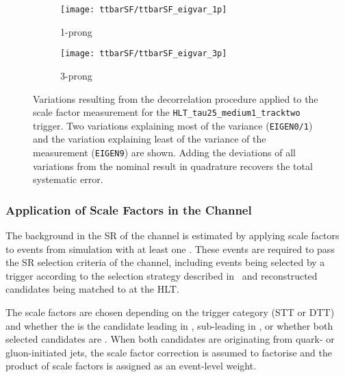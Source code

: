 \begin{figure}[htbp]
  \centering

  \begin{subfigure}[t]{.495\textwidth}
    \texttt{[image: ttbarSF/ttbarSF\_eigvar\_1p]}
    \caption{1-prong \tauhadvis}
    \label{fig:ttbarSF_eigenvariations_1p}
  \end{subfigure}\hfill%
  \begin{subfigure}[t]{.495\textwidth}
    \texttt{[image: ttbarSF/ttbarSF\_eigvar\_3p]}
    \caption{3-prong \tauhadvis}
    \label{fig:ttbarSF_eigenvariations_3p}
  \end{subfigure}

  \caption{Variations resulting from the decorrelation procedure
    applied to the \faketauhadvis scale factor measurement for the
    \texttt{HLT\_tau25\_medium1\_tracktwo} trigger. Two variations
    explaining most of the variance (\texttt{EIGEN0/1}) and the
    variation explaining least of the variance of the measurement
    (\texttt{EIGEN9}) are shown. Adding the deviations of all
    variations from the nominal result in quadrature recovers the
    total systematic error.}%
  \label{fig:ttbarSF_eigenvariations}
\end{figure}


\subsubsection{Application of \faketauhadvis Scale Factors in the
  \hadhad Channel}

The \ttbarFakes background in the SR of the \hadhad channel is estimated by
applying \faketauhadvis scale factors to \ttbar events from simulation with at
least one \faketauhadvis. These events are required to pass the SR selection
criteria of the \hadhad channel, including events being selected by a trigger
according to the selection strategy described in~ and
reconstructed \tauhadvis candidates being matched to \tauhadvis at the HLT.

The scale factors are chosen depending on the trigger category (STT or
DTT) and whether the \faketauhadvis is the \tauhadvis candidate
leading in \pT, sub-leading in \pT, or whether both selected
candidates are \faketauhadvis. When both \tauhadvis candidates are
originating from quark- or gluon-initiated jets, the scale factor correction is
assumed to factorise and the product of scale factors is assigned as
an event-level weight.

